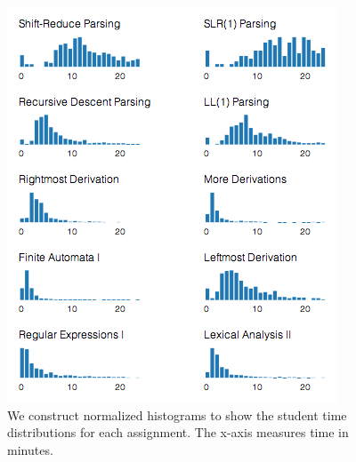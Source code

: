\documentclass{sigchi}
\begin{document}
\begin{figure}[!h]
\centering
\includegraphics[width=1\columnwidth]{hist_short}
\caption{We construct normalized histograms to show the student time distributions for each assignment. The x-axis measures time in minutes.}
\label{fig:distributions}
\end{figure}
\end{document}
